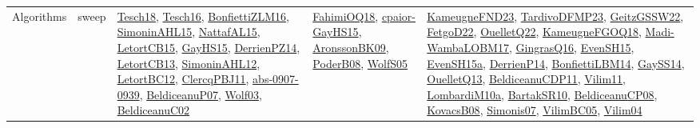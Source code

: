 {\begin{longtable}{lp{3cm}>{\raggedright}p{6cm}>{\raggedright}p{6cm}p{8cm}}
Algorithms & sweep & \href{papers/Tesch18.pdf}{Tesch18}\cite{Tesch18}, \href{papers/Tesch16.pdf}{Tesch16}\cite{Tesch16}, \href{papers/BonfiettiZLM16.pdf}{BonfiettiZLM16}\cite{BonfiettiZLM16}, \href{articles/SimoninAHL15.pdf}{SimoninAHL15}\cite{SimoninAHL15}, \href{articles/NattafAL15.pdf}{NattafAL15}\cite{NattafAL15}, \href{articles/LetortCB15.pdf}{LetortCB15}\cite{LetortCB15}, \href{papers/GayHS15.pdf}{GayHS15}\cite{GayHS15}, \href{papers/DerrienPZ14.pdf}{DerrienPZ14}\cite{DerrienPZ14}, \href{papers/LetortCB13.pdf}{LetortCB13}\cite{LetortCB13}, \href{papers/SimoninAHL12.pdf}{SimoninAHL12}\cite{SimoninAHL12}, \href{papers/LetortBC12.pdf}{LetortBC12}\cite{LetortBC12}, \href{papers/ClercqPBJ11.pdf}{ClercqPBJ11}\cite{ClercqPBJ11}, \href{articles/abs-0907-0939.pdf}{abs-0907-0939}\cite{abs-0907-0939}, \href{papers/BeldiceanuP07.pdf}{BeldiceanuP07}\cite{BeldiceanuP07}, \href{papers/Wolf03.pdf}{Wolf03}\cite{Wolf03}, \href{papers/BeldiceanuC02.pdf}{BeldiceanuC02}\cite{BeldiceanuC02} & \href{articles/FahimiOQ18.pdf}{FahimiOQ18}\cite{FahimiOQ18}, \href{papers/cpaior-GayHS15.pdf}{cpaior-GayHS15}\cite{cpaior-GayHS15}, \href{papers/AronssonBK09.pdf}{AronssonBK09}\cite{AronssonBK09}, \href{papers/PoderB08.pdf}{PoderB08}\cite{PoderB08}, \href{papers/WolfS05.pdf}{WolfS05}\cite{WolfS05} & \href{papers/KameugneFND23.pdf}{KameugneFND23}\cite{KameugneFND23}, \href{papers/TardivoDFMP23.pdf}{TardivoDFMP23}\cite{TardivoDFMP23}, \href{papers/GeitzGSSW22.pdf}{GeitzGSSW22}\cite{GeitzGSSW22}, \href{articles/FetgoD22.pdf}{FetgoD22}\cite{FetgoD22}, \href{papers/OuelletQ22.pdf}{OuelletQ22}\cite{OuelletQ22}, \href{papers/KameugneFGOQ18.pdf}{KameugneFGOQ18}\cite{KameugneFGOQ18}, \href{papers/Madi-WambaLOBM17.pdf}{Madi-WambaLOBM17}\cite{Madi-WambaLOBM17}, \href{papers/GingrasQ16.pdf}{GingrasQ16}\cite{GingrasQ16}, \href{papers/EvenSH15.pdf}{EvenSH15}\cite{EvenSH15}, \href{articles/EvenSH15a.pdf}{EvenSH15a}\cite{EvenSH15a}, \href{papers/DerrienP14.pdf}{DerrienP14}\cite{DerrienP14}, \href{articles/BonfiettiLBM14.pdf}{BonfiettiLBM14}\cite{BonfiettiLBM14}, \href{papers/GaySS14.pdf}{GaySS14}\cite{GaySS14}, \href{papers/OuelletQ13.pdf}{OuelletQ13}\cite{OuelletQ13}, \href{articles/BeldiceanuCDP11.pdf}{BeldiceanuCDP11}\cite{BeldiceanuCDP11}, \href{papers/Vilim11.pdf}{Vilim11}\cite{Vilim11}, \href{articles/LombardiM10a.pdf}{LombardiM10a}\cite{LombardiM10a}, \href{articles/BartakSR10.pdf}{BartakSR10}\cite{BartakSR10}, \href{papers/BeldiceanuCP08.pdf}{BeldiceanuCP08}\cite{BeldiceanuCP08}, \href{articles/KovacsB08.pdf}{KovacsB08}\cite{KovacsB08}, \href{articles/Simonis07.pdf}{Simonis07}\cite{Simonis07}, \href{articles/VilimBC05.pdf}{VilimBC05}\cite{VilimBC05}, \href{papers/Vilim04.pdf}{Vilim04}\cite{Vilim04}\\

\end{longtable}}
